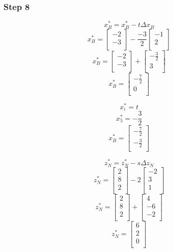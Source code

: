 \documentclass[14pt]{extarticle}
\begin{document}
\subsubsection*{Step 8}
\[
    x^*_B = x^*_B - t \Delta x_B
\]
\[
    x^*_B = \begin{bmatrix}
        -2 \\
        -3 \\
    \end{bmatrix}
    - \frac{-3}{2} \begin{bmatrix}
        -1 \\
        2 \\
    \end{bmatrix}
\]
\[
    x^*_B = \begin{bmatrix}
        -2 \\
        -3 \\
    \end{bmatrix}
    + \begin{bmatrix}
        -\frac{3}{2} \\
        3 \\
    \end{bmatrix}
\]
\[
    x^*_B = \begin{bmatrix}
        -\frac{7}{2} \\
        0 \\
    \end{bmatrix}
\]

\[
    x^*_i = t
\]
\[
    x^*_5 = -\frac{3}{2}
\]
\[
    x^*_B = \begin{bmatrix}
        -\frac{7}{2} \\
        -\frac{3}{2} \\
    \end{bmatrix}
\]

\[
    z^*_N = z^*_N - s \Delta z_N
\]
\[
    z^*_N = \begin{bmatrix}
        2 \\
        8 \\
        2 \\
    \end{bmatrix}
    - 2 \begin{bmatrix}
        -2 \\
        3 \\
        1 \\
    \end{bmatrix}
\]
\[
    z^*_N = \begin{bmatrix}
        2 \\
        8 \\
        2 \\
    \end{bmatrix}
    + \begin{bmatrix}
        4 \\
        -6 \\
        -2 \\
    \end{bmatrix}
\]
\[
    z^*_N = \begin{bmatrix}
        6 \\
        2 \\
        0 \\
    \end{bmatrix}
\]
\end{document}
